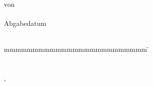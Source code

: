\begin{titlepage}
\begin{center}
    \vspace{9mm}	von\\ \large{} %
    \vspace{1mm} 	{\large\textbf{\authorOne}}\\
    \vspace{6mm}	Abgabedatum\\
    \vspace{2mm}		\submissionDate\\
  \end{center}
  \vspace{10mm}
  \vspace{-4mm}
  \begin{tabbing}
    mmmmmmmmmmmmmmmmmmmmmmmmm   		\= \kill
    \textbf{\projectTimeframeText}  		\>  \projectTimeframe\\
    \textbf{\matriculationNumberText}  	\>  \matriculationNumber \\
    \textbf{\courseText}							\>	\course\\
    \textbf{\companyText}      	\>  \company, \companyLocation\\
    \textbf{\tutorText}              	\>  \tutor\\
    \textbf{\secondTutorText}              	\>  \secondTutor
  \end{tabbing}
\end{titlepage}

